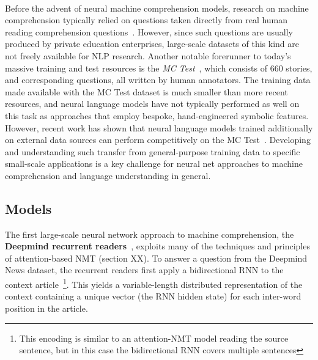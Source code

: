 \documentclass[11pt,letterpaper]{article}
\begin{document}
\paragraph{}Before the advent of neural machine comprehension models, research on machine comprehension typically relied on questions taken directly from real human reading comprehension questions~\cite{hirschman1999deep}. However, since such questions are usually produced by private education enterprises, large-scale datasets of this kind are not freely available for NLP research. Another notable forerunner to today's massive training and test resources is the \emph{MC Test}~\cite{richardson2013mctest}, which consists of 660 stories, and corresponding questions, all written by human annotators. The training data made available with the MC Test dataset is much smaller than more recent resources, and neural language models have not typically performed as well on this task as approaches that employ bespoke, hand-engineered symbolic features. However, recent work has shown that neural language models trained additionally on external data sources can perform competitively on the MC Test~\cite{trischler2016parallel}. Developing and understanding such transfer from general-purpose training data to specific small-scale applications is a key challenge for neural net approaches to machine comprehension and language understanding in general. 


\subsection{Models}
The first large-scale neural network approach to machine comprehension, the {\bf Deepmind recurrent readers}~\cite{hermann2015teaching}, exploits many of the techniques and principles of attention-based NMT (section XX). To answer a question from the Deepmind News dataset, the recurrent readers first apply a bidirectional RNN to the context article~\footnote{This encoding is similar to an attention-NMT model reading the source sentence, but in this case the bidirectional RNN covers multiple sentences}. This yields a variable-length distributed representation of the context containing a unique vector (the RNN hidden state) for each inter-word position in the article. 
\end{document}

